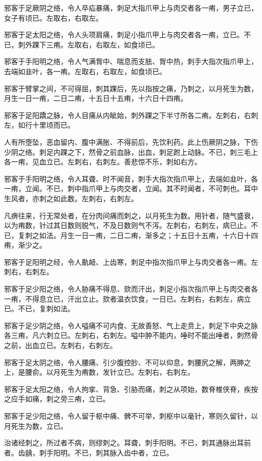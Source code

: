 \documentclass{article}%
\begin{document}
邪客于足厥阴之络，令人卒疝暴痛，刺足大指爪甲上与肉交者各一痏，男子立已，女子有顷已。左取右，右取左。

邪客于足太阳之络，令人头项肩痛，刺足小指爪甲上与肉交者各一痏，立已。不已，刺外踝下三痏。左取右，右取左，如食顷已。

邪客于手阳明之络，令人气满胷中、喘息而支胠、胷中热，刺手大指次指爪甲上，去端如韭叶，各一痏。左取右，右取左，如食顷已。

邪客于臂掌之间，不可得屈，刺其踝后，先以指按之痛，乃刺之，以月死生为数，月生一日一痏，二日二痏，十五日十五痏，十六日十四痏。

邪客于足阳蹻之脉，令人目痛从内眦始，刺外踝之下半寸所各二痏。左刺右，右刺左，如行十里顷而已。

人有所堕坠，恶血留内、腹中满胀、不得前后，先饮利药。此上伤厥阴之脉，下伤少阴之络。刺足内踝之下，然骨之前血脉，出血，刺足跗上动脉。不已，刺三毛上各一痏，见血立已。左刺右，右刺左。善悲惊不乐，刺如右方。

邪客于手阳明之络，令人耳聋、时不闻音，刺手大指次指爪甲上，去端如韭叶，各一痏，立闻。不已，刺中指爪甲上与肉交者，立闻。其不时闻者，不可刺也。耳中生风者，亦刺之如此数。左刺右，右刺左。

凡痹往来，行无常处者，在分肉间痛而刺之，以月死生为数。用针者，随气盛衰，以为痏数，针过其日数则脱气，不及日数则气不泻。左刺右，右刺左，病已止。不已，复刺之如法。月生一日一痏，二日二痏，渐多之；十五日十五痏，十六日十四痏，渐少之。

邪客于足阳明之经，令人鼽衄、上齿寒，刺足中指次指爪甲上与肉交者各一痏。左刺右，右刺左。

邪客于足少阳之络，令人胁痛不得息、欬而汗出，刺足小指次指爪甲上与肉交者各一痏，不得息立已，汗出立止。欬者温衣饮食，一日已。左刺右，右刺左，病立已。不已，复刺如法。

邪客于足少阴之络，令人嗌痛不可内食、无故善怒、气上走贲上，刺足下中央之脉各三痏，凡六刺立已。左刺右，右刺左。嗌中肿不能内，唾时不能出唾者，刺然骨之前，出血立已。左刺右，右刺左。

邪客于足太阴之络，令人腰痛、引少腹控䏚、不可以仰息，刺腰尻之解，两胂之上，是腰俞。以月死生为痏数，发针立已。左刺右，右刺左。

邪客于足太阳之络，令人拘挛、背急、引胁而痛，刺之从项始，数脊椎侠脊，疾按之应手如痛，刺之旁三痏，立已。

邪客于足少阳之络，令人留于枢中痛、髀不可举，刺枢中以毫针，寒则久留针，以月死生为数，立已。

治诸经刺之，所过者不病，则缪刺之。耳聋，刺手阳明。不已，刺其通脉出耳前者。齿龋，刺手阳明。不已，刺其脉入齿中者，立已。
\end{document}
